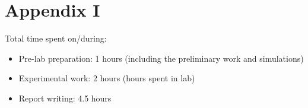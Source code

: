 \documentclass[letterpaper,12pt]{article}
\begin{document}
\section*{Appendix I}
Total time spent on/during:
\begin{itemize}
	\item Pre-lab preparation: 1 hours (including the preliminary work and simulations) 
	\item Experimental work: 2 hours (hours spent in lab)
	\item Report writing: 4.5 hours 
\end{itemize}



\end{document}
